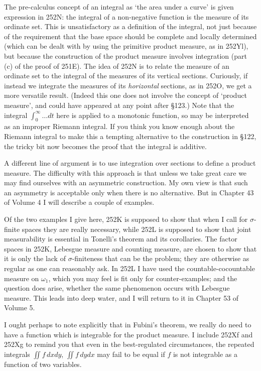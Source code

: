 {The pre-calculus concept of an integral as `the area under a curve' is
given expression in 252N:  the integral of a non-negative function is
the measure of its ordinate set.   This is unsatisfactory as a
definition of the integral, not just because of the requirement that the
base space should be complete and locally determined (which can be dealt
with by using the primitive product measure, as in 252Yl), but because
the construction of the product measure involves integration (part (c)
of the proof of 251E).
The idea of 252N is to relate the measure of an ordinate set to the
integral of the measures of its vertical sections.   Curiously, if
instead we integrate the measures of its {\it horizontal} sections, as
in 252O, we get a more versatile result.   (Indeed this one does not
involve the concept of `product measure', and could have appeared at any
point after \S123.)   Note that the integral
$\int_0^{\infty}\ldots dt$ here is applied to a monotonic function, so
may be interpreted as an improper Riemann integral.   If you think you
know enough about the Riemann integral to
make this a tempting alternative to the construction in \S122, the
tricky bit now becomes the proof that the integral is additive.

A different line of argument is to use integration over sections to
define a product measure.   The difficulty with this approach is that
unless we take great care we may find ourselves with an asymmetric
construction.   My own view is that such an asymmetry is acceptable only
when there is no alternative.   But in Chapter 43 of Volume 4 I will
describe a couple of examples.

Of the two examples I give here, 252K is supposed to show that when I
call for $\sigma$-finite spaces they are really necessary, while 252L is
supposed to show that joint measurability is essential in Tonelli's
theorem and its corollaries.   The factor spaces in 252K, Lebesgue
measure and counting measure, are chosen to show that it is only the
lack of $\sigma$-finiteness that can be the problem;  they are otherwise
as regular as one can reasonably ask.   In 252L I have used the
countable-cocountable measure on $\omega_1$, which you may feel is fit
only for counter-examples;  and the question does arise, whether the
same phenomenon occurs with Lebesgue measure.   This leads into deep
water, and I will return to it in Chapter 53 of Volume 5.

I ought perhaps to note explicitly that in Fubini's theorem, we really
do need to have a function which is integrable for the product measure.
I include 252Xf and 252Xg to remind you that even in the best-regulated
circumstances,
the repeated integrals $\iint f\,dxdy$, $\iint f\,dydx$ may fail to be
equal if $f$ is not integrable as a function of two variables.

}
